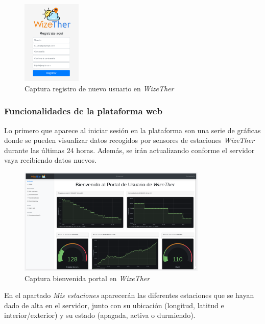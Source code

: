 \documentclass[12pt]{article}
\begin{document}
\begin{figure}[h]
	\begin{center}
		\includegraphics[width=0.25\textwidth]{img_rani/registro.png}
		\caption{Captura registro de nuevo usuario en \textit{WizeTher}}
	\end{center}
\end{figure}

\pagebreak

\subsubsection{Funcionalidades de la plataforma web}

Lo primero que aparece al iniciar sesión en la plataforma son una serie de gráficas donde se pueden visualizar datos recogidos por sensores de estaciones \textit{WizeTher} durante las últimas 24 horas. Además, se irán actualizando conforme el servidor vaya recibiendo datos nuevos. 

\begin{figure}[h]
	\begin{center}
		\includegraphics[width=0.8\textwidth]{img_rani/dashboard_user.png}
		\caption{Captura bienvenida portal en \textit{WizeTher}}
	\end{center}
\end{figure}

\pagebreak

\noindent En el apartado \textit{Mis estaciones} aparecerán las diferentes estaciones que se hayan dado de alta en el servidor, junto con su ubicación (longitud, latitud e interior/exterior) y su estado (apagada, activa o durmiendo).
\end{document}
